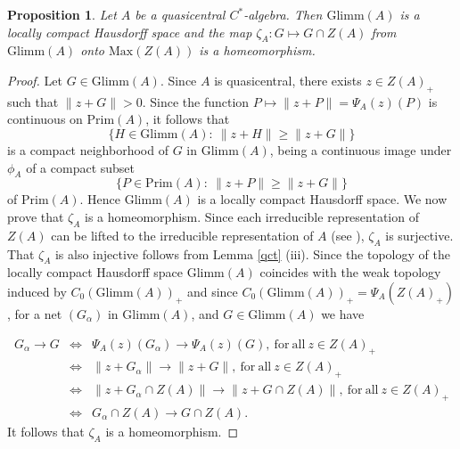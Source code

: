\documentclass[]{amsart}
\newtheorem{proposition}[theorem]{Proposition}
\theoremstyle{remark}
\theoremstyle{definition}
\theoremstyle{question}
\numberwithin{equation}{section}
\begin{document}
\begin{proposition}\label{zz} Let $A$ be a quasicentral $C^*$-algebra. Then
$\mathrm{Glimm}(A)$ is a locally compact Hausdorff space and the map
$\zeta_A : G \mapsto G \cap Z(A)$ from $\mathrm{Glimm}(A)$ onto
$\mathrm{Max}(Z(A))$ is a homeomorphism.
\end{proposition}
\begin{proof} Let $G \in \mathrm{Glimm}(A)$. Since $A$ is quasicentral, there
exists $z \in Z(A)_+$ such that $\|z+G\|>0$. Since the function
$P \mapsto \|z+P\|=\Psi_A(z)(P)$ is continuous on $\mathrm{Prim}(A)$, it follows that
$$\{H \in \mathrm{Glimm}(A) : \ \|z+H\| \geq \|z+G\| \}$$
is a compact neighborhood of $G$ in $\mathrm{Glimm}(A)$, being a continuous
image under $\phi_A$ of a compact subset
$$\{P \in \mathrm{Prim}(A) : \ \|z+P\| \geq \|z+G\|\}$$
of $\mathrm{Prim}(A)$. Hence $\mathrm{Glimm}(A)$ is a locally compact Hausdorff
space. We now prove that $\zeta_A$ is a homeomorphism. Since each irreducible representation of $Z(A)$ can be
lifted to the irreducible representation of $A$ (see \cite[II.6.4.11]{Bla}), $\zeta_A$ is
surjective. That $\zeta_A$ is also injective follows from Lemma \ref{qct}
(iii). Since the topology of the locally compact Hausdorff space
$\mathrm{Glimm}(A)$ coincides with the weak topology induced by
$C_0(\mathrm{Glimm}(A))_+$ and since $C_0(\mathrm{Glimm}(A))_+=\Psi_A(Z(A)_+)$,
 for a net $(G_\alpha)$ in $\mathrm{Glimm}(A)$, and $G \in \mathrm{Glimm}(A)$ we
have

\begin{eqnarray*}
 G_\alpha \to G &\iff& \Psi_A(z)(G_\alpha) \to \Psi_A(z)(G), \
\mathrm{for} \ \mathrm{all} \ z \in Z(A)_+\\
&\iff& \|z+G_\alpha\|
\to \|z+G\|, \ \mathrm{for} \ \mathrm{all} \ z \in Z(A)_+ \\
&\iff&
\|z+ G_\alpha \cap Z(A)\| \to \|z+G \cap Z(A)\|, \ \mathrm{for} \ \mathrm{all} \
z \in Z(A)_+ \\
&\iff& G_\alpha \cap Z(A) \to G\cap Z(A).
\end{eqnarray*}
It follows that $\zeta_A$ is a homeomorphism.
\end{proof}
\end{document}
